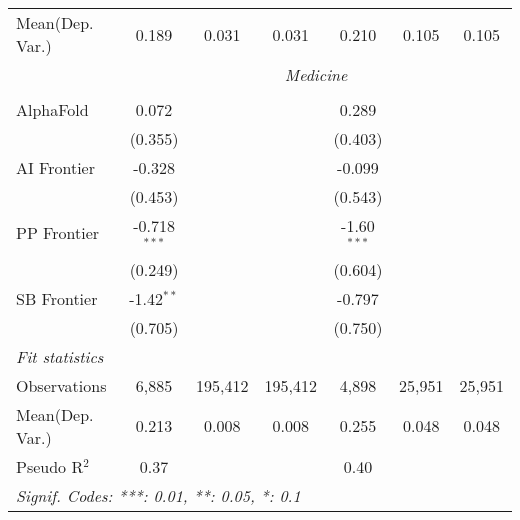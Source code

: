 \begin{tabular}{lcccccc}
Mean(Dep. Var.) & 0.189 & 0.031 & 0.031 & 0.210 & 0.105 & 0.105 \\
 & \multicolumn{6}{c}{\textit{Medicine}} \\ \\
   AlphaFold    & 0.072          &         &         & 0.289         &        &   \\   
                & (0.355)        &         &         & (0.403)       &        &   \\   
   AI Frontier  & -0.328         &         &         & -0.099        &        &   \\   
                & (0.453)        &         &         & (0.543)       &        &   \\   
   PP Frontier  & -0.718$^{***}$ &         &         & -1.60$^{***}$ &        &   \\   
                & (0.249)        &         &         & (0.604)       &        &   \\   
   SB Frontier  & -1.42$^{**}$   &         &         & -0.797        &        &   \\   
                & (0.705)        &         &         & (0.750)       &        &   \\   
   \midrule
   \emph{Fit statistics}\\
   Observations & 6,885          & 195,412 & 195,412 & 4,898         & 25,951 & 25,951\\  
Mean(Dep. Var.) & 0.213 & 0.008 & 0.008 & 0.255 & 0.048 & 0.048 \\
   Pseudo R$^2$ & 0.37           &         &         & 0.40          &        & \\  
   \midrule \midrule
   \multicolumn{7}{l}{\emph{Signif. Codes: ***: 0.01, **: 0.05, *: 0.1}}\\
\end{tabular}
\par\endgroup
